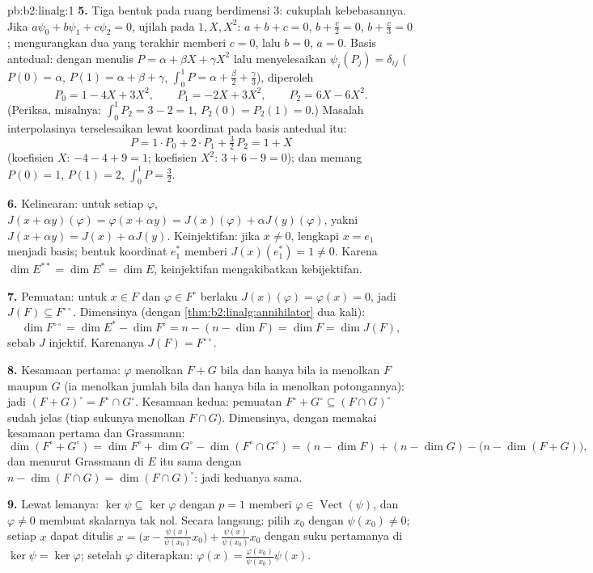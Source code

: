 \begin{solution}{pb:b2:linalg:1}
\textbf{5.} Tiga bentuk pada ruang berdimensi $3$: cukuplah
kebebasannya. Jika $a\psi_0 + b\psi_1 + c\psi_2 = 0$, ujilah pada $1, X,
X^2$: $a + b + c = 0$, $b + \frac c2 = 0$, $b + \frac c3 = 0$;
mengurangkan dua yang terakhir memberi $c = 0$, lalu $b = 0$, $a = 0$.
Basis antedual: dengan menulis $P = \alpha + \beta X + \gamma X^2$ lalu
menyelesaikan $\psi_i(P_j) = \delta_{ij}$ ($P(0) = \alpha$, $P(1) =
\alpha + \beta + \gamma$, $\int_0^1 P = \alpha + \frac\beta2 +
\frac\gamma3$), diperoleh
\[
P_0 = 1 - 4X + 3X^2, \qquad
P_1 = -2X + 3X^2, \qquad
P_2 = 6X - 6X^2 .
\]
(Periksa, misalnya: $\int_0^1 P_2 = 3 - 2 = 1$, $P_2(0) = P_2(1) = 0$.)
Masalah interpolasinya terselesaikan lewat koordinat pada
basis antedual itu:
\[
P = 1\cdot P_0 + 2\cdot P_1 + \tfrac32\, P_2 = 1 + X
\]
(koefisien $X$: $-4 - 4 + 9 = 1$; koefisien $X^2$: $3 + 6 - 9 =
0$); dan memang $P(0) = 1$, $P(1) = 2$, $\int_0^1 P = \frac32$.

\textbf{6.} Kelinearan: untuk setiap $\varphi$, $J(x + \alpha
y)(\varphi) = \varphi(x + \alpha y) = J(x)(\varphi) + \alpha
J(y)(\varphi)$, yakni $J(x + \alpha y) = J(x) + \alpha J(y)$.
Keinjektifan: jika $x \neq 0$, lengkapi $x = e_1$ menjadi basis; bentuk
koordinat $e_1^*$ memberi $J(x)(e_1^*) = 1 \neq 0$. Karena $\dim E^{**} =
\dim E^* = \dim E$, keinjektifan mengakibatkan kebijektifan.

\textbf{7.} Pemuatan: untuk $x \in F$ dan $\varphi \in F^\circ$ berlaku
$J(x)(\varphi) = \varphi(x) = 0$, jadi $J(F) \subseteq
F^{\circ\circ}$. Dimensinya (dengan
\cref{thm:b2:linalg:annihilator} dua kali):
\[
\dim F^{\circ\circ} = \dim E^* - \dim F^\circ
= n - (n - \dim F) = \dim F = \dim J(F),
\]
sebab $J$ injektif. Karenanya $J(F) = F^{\circ\circ}$.

\textbf{8.} Kesamaan pertama: $\varphi$ menolkan $F + G$ bila dan hanya
bila ia menolkan $F$ maupun $G$ (ia menolkan jumlah bila dan hanya bila
ia menolkan potongannya): jadi $(F+G)^\circ = F^\circ \cap G^\circ$.
Kesamaan kedua: pemuatan $F^\circ + G^\circ \subseteq (F \cap G)^\circ$
sudah jelas (tiap sukunya menolkan $F \cap G$). Dimensinya, dengan
memakai kesamaan pertama dan Grassmann:
\[
\dim(F^\circ + G^\circ) = \dim F^\circ + \dim G^\circ -
\dim(F^\circ \cap G^\circ)
= (n - \dim F) + (n - \dim G) - \bigl(n - \dim(F +
G)\bigr),
\]
dan menurut Grassmann di $E$ itu sama dengan $n - \dim(F \cap G) =
\dim(F \cap G)^\circ$: jadi keduanya sama.

\textbf{9.} Lewat lemanya: $\ker\psi \subseteq \ker\varphi$ dengan
$p = 1$ memberi $\varphi \in \operatorname{Vect}(\psi)$, dan
$\varphi \neq 0$ membuat skalarnya tak nol. Secara langsung: pilih $x_0$
dengan $\psi(x_0) \neq 0$; setiap $x$ dapat ditulis $x = \bigl(x -
\frac{\psi(x)}{\psi(x_0)}x_0\bigr) + \frac{\psi(x)}{\psi(x_0)}
x_0$ dengan suku pertamanya di $\ker\psi = \ker\varphi$; setelah
$\varphi$ diterapkan: $\varphi(x) = \frac{\varphi(x_0)}{\psi(x_0)}\psi(x)$.


\end{solution}
